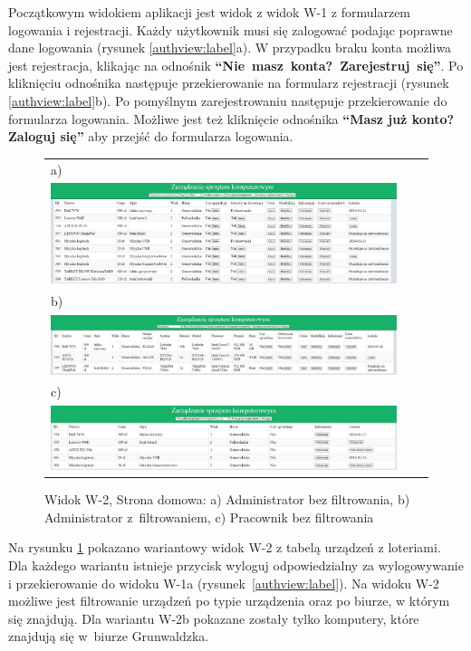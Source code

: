 \newpage
Początkowym widokiem aplikacji jest widok z widok W-1 z formularzem logowania i rejestracji. Każdy użytkownik musi się zalogować podając poprawne dane logowania (rysunek \ref{authview:label}a). W przypadku braku konta możliwa jest rejestracja, klikając na odnośnik \textbf{\mbox{"`Nie masz konta? Zarejestruj się"'}}. Po kliknięciu odnośnika następuje przekierowanie na formularz rejestracji (rysunek \ref{authview:label}b). Po pomyślnym zarejestrowaniu następuje przekierowanie do formularza logowania. Możliwe jest też kliknięcie odnośnika \textbf{"`Masz już konto? Zaloguj się"'} aby przejść do formularza logowania.
\begin{figure}[H]
  \centering
	\begin{tabular}{@{}lll@{}}
	a)\\
  \includegraphics[width=\textwidth]{rys05/view/alldevices.pdf} \\
	
	b)\\
	\includegraphics[width=\textwidth]{rys05/view/compGrun.pdf} \\
	c) \\
	\includegraphics[width=\textwidth]{rys05/view/pracownikHome.pdf}
	\end{tabular}
  \caption{Widok W-2, Strona domowa: a) Administrator bez filtrowania, b) Administrator z~filtrowaniem, c) Pracownik bez filtrowania}
  \label{home:label}
\end{figure}

Na rysunku \ref{home:label} pokazano wariantowy widok W-2 z tabelą urządzeń z loteriami. Dla każdego wariantu istnieje przycisk wyloguj odpowiedzialny za wylogowywanie i przekierowanie do widoku W-1a (rysunek~\ref{authview:label}). Na widoku W-2 możliwe jest filtrowanie urządzeń po typie urządzenia oraz po biurze, w którym się znajdują. Dla wariantu W-2b pokazane zostały tylko komputery, które znajdują się w~biurze Grunwaldzka. 


